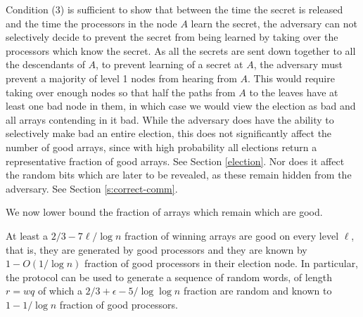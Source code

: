 \documentclass{sig-alternate}
\begin{document}
 Condition (3) is sufficient to show that  between the time the secret is released and the time the processors in the node $A$  learn the secret, the adversary can not selectively decide to prevent the secret from being learned by taking over the processors which know the secret.  As all the secrets are sent down together to all the descendants of $A$, to prevent learning of a secret at $A$, the adversary must prevent a majority of level 1 nodes from hearing from $A$. This would require taking over enough nodes so that half the paths from $A$ to the leaves have at least one bad node in them, in which case we would view the election as bad and all arrays contending in it  bad.  While the adversary does have the ability to selectively make bad an entire election, this does not significantly affect the number of good arrays, since with high probability all elections return a representative fraction of good arrays.  See  Section \ref{election}. Nor does it affect the random bits which are later to be revealed, as these remain hidden from the adversary.  See  Section \ref{s:correct-comm}.

We  now lower  bound the fraction of arrays which remain which are good.

\begin{lemma}
At least a $2/3- 7 \ell /\log n  $ fraction of  winning arrays are good on every level $\ell$, that is, they are generated by good processors and
they are known by $1-O(1/\log n)$ fraction of good processors in their election node. 
In particular, the protocol can be used to generate a sequence of random words, of length $r=wq$ of which a $2/3 + \epsilon - 5 /\log \log  n$ fraction are random and known to $1-1/\log n$ fraction of good processors. 
\end{lemma}
\end{document}
